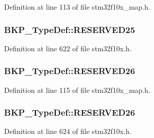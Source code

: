 Definition at line 113 of file stm32f10x\+\_\+map.\+h.

\subsubsection[{\texorpdfstring{R\+E\+S\+E\+R\+V\+E\+D25}{RESERVED25}}]{ B\+K\+P\+\_\+\+Type\+Def\+::\+R\+E\+S\+E\+R\+V\+E\+D25}\hypertarget{struct_b_k_p___type_def_a01f10508a2682305102274edc7cb09fe}{}\label{struct_b_k_p___type_def_a01f10508a2682305102274edc7cb09fe}


Definition at line 622 of file stm32f10x.\+h.

\subsubsection[{\texorpdfstring{R\+E\+S\+E\+R\+V\+E\+D26}{RESERVED26}}]{ B\+K\+P\+\_\+\+Type\+Def\+::\+R\+E\+S\+E\+R\+V\+E\+D26}\hypertarget{struct_b_k_p___type_def_abd33f261dbbb5c2394cc1a556ca44e20}{}\label{struct_b_k_p___type_def_abd33f261dbbb5c2394cc1a556ca44e20}


Definition at line 115 of file stm32f10x\+\_\+map.\+h.

\subsubsection[{\texorpdfstring{R\+E\+S\+E\+R\+V\+E\+D26}{RESERVED26}}]{ B\+K\+P\+\_\+\+Type\+Def\+::\+R\+E\+S\+E\+R\+V\+E\+D26}\hypertarget{struct_b_k_p___type_def_a152ba38e76af1a18836fa3eb6bfbfd83}{}\label{struct_b_k_p___type_def_a152ba38e76af1a18836fa3eb6bfbfd83}


Definition at line 624 of file stm32f10x.\+h.

